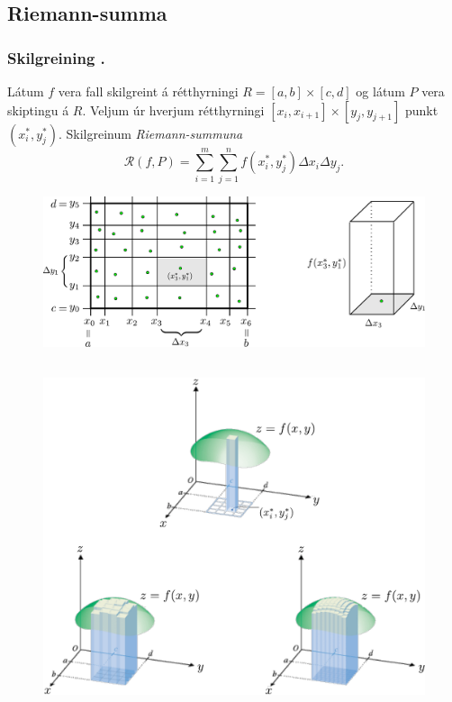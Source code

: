 \subsection{Riemann-summa} 

\subsubsection{Skilgreining \kaflanr.}
  
 Látum $f$ vera fall skilgreint á rétthyrningi $R=[a,b]\times[c,d]$ og
 látum $P$ vera skiptingu á $R$.  Veljum úr hverjum rétthyrningi
 $[x_i,x_{i+1}]\times [y_j,y_{j+1}]$ punkt $(x_i^*, y_j^*)$.  
Skilgreinum \emph{Riemann-summuna}
$$\mathcal{R}(f,P)=\sum_{i=1}^m\sum_{j=1}^n f(x_i^*, y_j^*)\Delta x_i\Delta
  y_j.$$

   \begin {figure}[h!]
 \centering
            \includegraphics[width=.95\linewidth]{skipting2.pdf}
            \caption*{}
\end {figure}




\subsection{}
    \begin {figure}[h!]
 \centering
            \includegraphics[width=0.9\linewidth]{double.pdf}
            \caption*{}
\end {figure}



